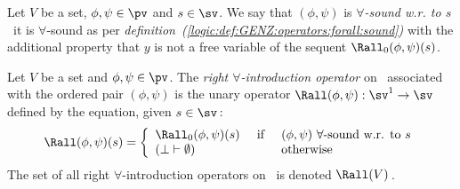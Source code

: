 \begin{defin}\label{logic:def:GENZ:operators:forall:sound:right}
Let $V$ be a set, $\phi,\psi\in\pv$ and $s\in\sv$. We say that
$(\phi,\psi)$ is {\em $\forall$-sound w.r. to $s$} \ifand\ it is
$\forall$-sound as per {\em
definition~(\ref{logic:def:GENZ:operators:forall:sound})} with the
additional property that $y$ is not a free variable of the sequent
$\Rall_{0}(\phi,\psi)(s)$.
\end{defin}


\begin{defin}\label{logic:def:GENZ:operators:Rforall}
Let $V$ be a set and $\phi,\psi\in\pv$. The {\em right
$\forall$-introduction operator} on \sv\ associated with the ordered
pair $(\phi,\psi)$ is the unary operator
$\Rall(\phi,\psi):\sv^{1}\to\sv$ defined by the equation, given
$s\in\sv$\,:
    \[
    \Rall(\phi,\psi)(s)=\left\{
        \begin{array}{lcl}
        \Rall_{0}(\phi,\psi)(s)&\mbox{\ if\ }&(\phi,\psi)\ \mbox{$\forall$-sound w.r. to $s$}\\
        (\bot\vdash\emptyset)&\ \ \ \ &\mbox{otherwise}\\
        \end{array}
    \right.
    \]
The set of all right $\forall$-introduction operators on \sv\ is
denoted $\Rall(V)$\,.
\end{defin}
